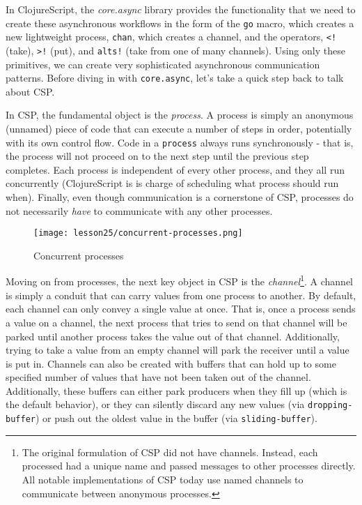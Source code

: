 \documentclass[10pt,twoside,openright]{memoir}
\begin{document}
In ClojureScript, the \emph{core.async} library provides the
functionality that we need to create these asynchronous workflows in the
form of the \texttt{go} macro, which creates a new lightweight process,
\texttt{chan}, which creates a channel, and the operators,
\texttt{\textless{}!} (take), \texttt{\textgreater{}!} (put), and
\texttt{alts!} (take from one of many channels). Using only these
primitives, we can create very sophisticated asynchronous communication
patterns. Before diving in with \texttt{core.async}, let's take a quick
step back to talk about CSP.

In CSP, the fundamental object is the \emph{process}. A process is
simply an anonymous (unnamed) piece of code that can execute a number of
steps in order, potentially with its own control flow. Code in a
\texttt{process} always runs synchronously - that is, the process will
not proceed on to the next step until the previous step completes. Each
process is independent of every other process, and they all run
concurrently (ClojureScript is is charge of scheduling what process
should run when). Finally, even though communication is a cornerstone of
CSP, processes do not necessarily \emph{have} to communicate with any
other processes.

\begin{figure}[H]
\caption{Concurrent processes}
\centering
\texttt{[image: lesson25/concurrent-processes.png]}
\end{figure}

Moving on from processes, the next key object in CSP is the
\emph{channel}\footnote{The original formulation of CSP did not have
  channels. Instead, each processed had a unique name and passed
  messages to other processes directly. All notable implementations of
  CSP today use named channels to communicate between anonymous
  processes.}. A channel is simply a conduit that can carry values from
one process to another. By default, each channel can only convey a
single value at once. That is, once a process sends a value on a
channel, the next process that tries to send on that channel will be
parked until another process takes the value out of that channel.
Additionally, trying to take a value from an empty channel will park the
receiver until a value is put in. Channels can also be created with
buffers that can hold up to some specified number of values that have
not been taken out of the channel. Additionally, these buffers can
either park producers when they fill up (which is the default behavior),
or they can silently discard any new values (via
\texttt{dropping-buffer}) or push out the oldest value in the buffer
(via \texttt{sliding-buffer}).
\end{document}
